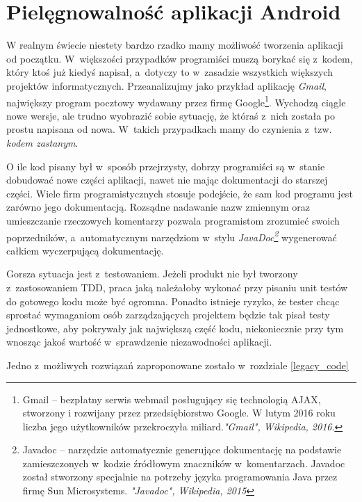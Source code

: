 \section{Pielęgnowalność aplikacji Android}
\label{pielegnowalnosc_aplikacji}
W realnym świecie niestety bardzo rzadko mamy możliwość tworzenia aplikacji od początku. W~większości przypadków programiści muszą borykać się z~kodem, który ktoś już kiedyś napisał, a~dotyczy to w~zasadzie wszystkich większych projektów informatycznych. Przeanalizujmy jako przykład  aplikację \textit{Gmail}, największy program pocztowy wydawany przez firmę Google\footnote{Gmail – bezpłatny serwis webmail posługujący się technologią AJAX, stworzony i rozwijany przez przedsiębiorstwo Google. W lutym 2016 roku liczba jego użytkowników przekroczyła miliard.\textit{"Gmail", Wikipedia, 2016}.}. Wychodzą ciągle nowe wersje, ale trudno wyobrazić sobie sytuację, że któraś z~nich została po prostu napisana od nowa. W~takich przypadkach mamy do czynienia z~tzw. \textit{kodem zastanym}.

O ile kod pisany był w~sposób przejrzysty, dobrzy programiści są w~stanie dobudować nowe części aplikacji, nawet nie mając dokumentacji do starszej części. Wiele firm programistycznych stosuje podejście, że sam kod programu jest zarówno jego dokumentacją. Rozsądne nadawanie nazw zmiennym oraz umieszczanie rzeczowych komentarzy pozwala programistom zrozumieć swoich poprzedników, a~automatycznym narzędziom w~stylu \textit{JavaDoc\footnote{Javadoc – narzędzie automatycznie generujące dokumentację na podstawie zamieszczonych w~kodzie źródłowym znaczników w~komentarzach. Javadoc został stworzony specjalnie na potrzeby języka programowania Java przez firmę Sun Microsystems. \textit{"Javadoc", Wikipedia, 2015}}} wygenerować całkiem wyczerpującą dokumentację.

Gorsza sytuacja jest z~testowaniem. Jeżeli produkt nie był tworzony z~zastosowaniem TDD, praca jaką należałoby wykonać przy pisaniu unit testów do gotowego kodu może być ogromna. Ponadto istnieje ryzyko, że tester chcąc sprostać wymaganiom osób zarządzających projektem będzie tak pisał testy jednostkowe, aby pokrywały jak największą część kodu, niekoniecznie przy tym wnosząc jakoś wartość w~sprawdzenie niezawodności aplikacji.

Jedno z~możliwych rozwiązań zaproponowane zostało w~rozdziale \ref{legacy_code}